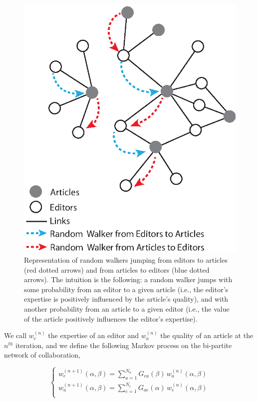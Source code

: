 \begin{figure}[!t]
\centering
\includegraphics[width=0.7\columnwidth]{../Figures/bi-partite_net.eps}
\caption{Representation of random walkers jumping from editors to articles (red dotted arrows) and from articles to editors (blue dotted arrows). The intuition is the following: a random walker jumps with some probability from an editor to a given article (i.e., the editor's expertise is positively influenced by the article's quality), and with another probability from an article to a given editor (i.e., the value of the article positively influences the editor's expertise).}
\label{fig:jumpers}
\end{figure}

We call $w^{(n)}_e$ the expertise of an editor and $w^{(n)}_a$ the quality of an article at the $n^{th}$ iteration, and we define the following Markov process on the bi-partite network of collaboration, 

\begin{equation}
\begin{cases}
w^{(n+1)}_e (\alpha,\beta) = \sum_{a=1}^{N_a}  G_{ea}(\beta) \,w^{(n)}_a (\alpha,\beta)\\[7pt]
w^{(n+1)}_a (\alpha,\beta) = \sum_{e=1}^{N_e}  G_{ae}(\alpha) \, w^{(n)}_e (\alpha,\beta)\\
\end{cases}
\label{random_walker}
\end{equation}

